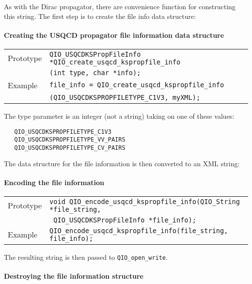 \documentclass{article}
\begin{document}
As with the Dirac propagator, there are convenience function for
constructing this string.  The first step is to create the file info
data structure:

\paragraph{Creating the USQCD propagator file information data structure}
%
\begin{flushleft}
  \begin{tabular}{|l|l|}
  \hline
  Prototype      & \verb|QIO_USQCDKSPropFileInfo *QIO_create_usqcd_kspropfile_info|\\
                 & \verb|(int type, char *info);|\\
\hline
  Example  & \verb|file_info = QIO_create_usqcd_kspropfile_info |\\
           & \verb|(QIO_USQCDKSPROPFILETYPE_C1V3, myXML);|\\
   \hline
 \end{tabular}
\end{flushleft}
%
The type parameter is an integer (not a string) taking on one of these
values:
%
\begin{verbatim}
   QIO_USQCDKSPROPFILETYPE_C1V3
   QIO_USQCDKSPROPFILETYPE_VV_PAIRS
   QIO_USQCDKSPROPFILETYPE_CV_PAIRS
\end{verbatim}
%

The data structure for the file information is then converted to an
XML string:

\paragraph{Encoding the file information}

%
\begin{flushleft}
  \begin{tabular}{|l|l|}
  \hline
  Prototype      & \verb|void QIO_encode_usqcd_kspropfile_info(QIO_String *file_string,|\\
                 & \verb| QIO_USQCDKSPropFileInfo *file_info);|\\
\hline
  Example  & \verb|QIO_encode_usqcd_kspropfile_info(file_string, file_info);|\\
   \hline
 \end{tabular}
\end{flushleft}
%

The resulting string is then passed to \verb|QIO_open_write|.

%
\paragraph{Destroying the file information structure}
\end{document}
